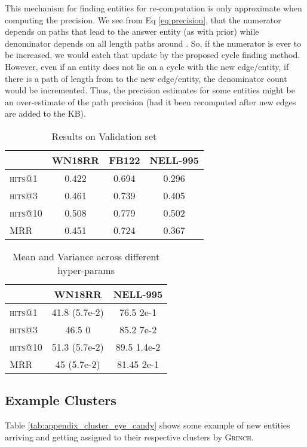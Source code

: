 \documentclass[11pt,a4paper]{article}
\newcommand{\nell}{NELL-995\xspace}
\newcommand{\grinch}{\textsc{Grinch}\xspace}
\begin{document}
This mechanism for finding entities for re-computation is only approximate when computing the precision. We see from Eq \ref{eq:precision}, that the numerator depends on paths that lead to the answer entity (as with prior) while denominator depends on all  length paths around . So, if the numerator is ever to be increased, we would catch that update by the proposed cycle finding method. However, even if an entity does not lie on a cycle with the new edge/entity, if there is a path of length  from  to the new edge/entity, the denominator count would be incremented. Thus, the precision estimates for some entities might be an over-estimate of the path precision (had it been recomputed after new edges are added to the KB).



\begin{table}
\centering
\small
\begin{tabular}{ l  c c c}
\toprule
& \textbf{WN18RR} & \textbf{FB122} & \textbf{\nell}  \\ 
\midrule
  \textsc{hits}@1 & 0.422 & 0.694 & 0.296\\
  \textsc{hits}@3  & 0.461 & 0.739 & 0.405\\
  \textsc{hits}@10  & 0.508 & 0.779 & 0.502\\
  \textsc{MRR}   & 0.451 & 0.724 & 0.367\\
\bottomrule
\end{tabular}
\caption{Results on Validation set}
\label{tab:validation_results}
\end{table}

\begin{table}
\centering
\small
\begin{tabular}{ l  c c}
\toprule
& \textbf{WN18RR} & \textbf{NELL-995}   \\ 
\midrule
  \textsc{hits}@1 & 41.8  (5.7e-2) & 76.5  2e-1\\
  \textsc{hits}@3  & 46.5  0 & 85.2  7e-2\\
  \textsc{hits}@10  & 51.3  (5.7e-2)& 89.5  1.4e-2\\
  \textsc{MRR}   &  45  (5.7e-2) & 81.45  2e-1\\
\bottomrule
\end{tabular}
\caption{Mean and Variance across different hyper-params}
\label{tab:diff_hyper_param_test}
\end{table}

\subsection{Example Clusters}
Table \ref{tab:appendix_cluster_eye_candy} shows some example of new entities arriving and getting assigned to their respective clusters by \grinch.
\end{document}
